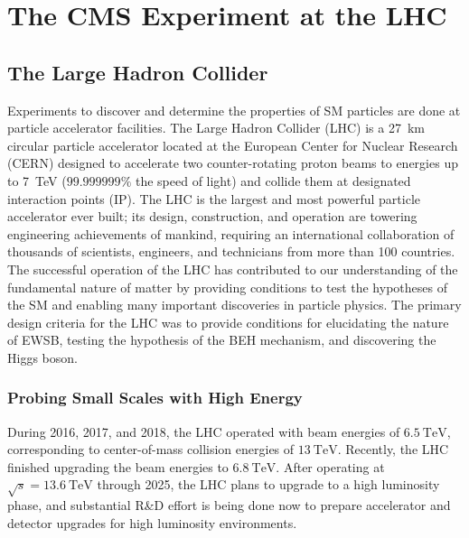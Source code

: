 
\chapter{The CMS Experiment at the LHC}

\section{The Large Hadron Collider}
Experiments to discover and determine the properties of SM particles are done at particle accelerator facilities.
The Large Hadron Collider (LHC) is a \SI{27}{\km} circular particle accelerator located at the European Center for Nuclear Research (CERN) designed to accelerate two counter-rotating proton beams to energies up to \SI{7}{\TeV} ($99.999999\%$ the speed of light) and collide them at designated interaction points (IP).
The LHC is the largest and most powerful particle accelerator ever built; its design, construction, and operation are towering engineering achievements of mankind, requiring an international collaboration of thousands of scientists, engineers, and technicians from more than 100 countries.
The successful operation of the LHC has contributed to our understanding of the fundamental nature of matter by providing conditions to test the hypotheses of the SM and enabling many important discoveries in particle physics.
The primary design criteria for the LHC was to provide conditions for elucidating the nature of EWSB, testing the hypothesis of the BEH mechanism, and discovering the Higgs boson.

\subsection{Probing Small Scales with High Energy}
During 2016, 2017, and 2018, the LHC operated with beam energies of $\SI{6.5}{\TeV}$, corresponding to center-of-mass collision energies of $\SI{13}{\TeV}$.
Recently, the LHC finished upgrading the beam energies to $\SI{6.8}{\TeV}$.
After operating at $\sqrt{s}=\SI{13.6}{\TeV}$ through 2025, the LHC plans to upgrade to a high luminosity phase, and substantial R\&D effort is being done now to prepare accelerator and detector upgrades for high luminosity environments.

